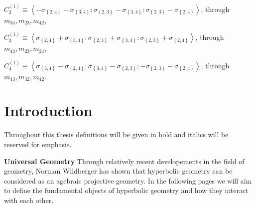 \documentclass[11pt]{article}
\begin{document}
$C_{2}^{\left( 1\right) }\equiv \left\langle -\sigma _{\left\{ 2,4\right\}
}-\sigma _{\left\{ 3,4\right\} }:\sigma _{\left\{ 2,3\right\} }-\sigma
_{\left\{ 3,4\right\} }:\sigma _{\left\{ 2,3\right\} }-\sigma _{\left\{
2,4\right\} }\right\rangle $, through $m_{34},m_{23},m_{42}$,

$C_{3}^{\left( 1\right) }\equiv \left\langle \sigma _{\left\{ 2,4\right\}
}+\sigma _{\left\{ 3,4\right\} }:\sigma _{\left\{ 2,3\right\} }+\sigma
_{\left\{ 3,4\right\} }:\sigma _{\left\{ 2,3\right\} }+\sigma _{\left\{
2,4\right\} }\right\rangle $, through $m_{43},m_{23},m_{24}$,

$C_{4}^{\left( 1\right) }\equiv \left\langle \sigma _{\left\{ 3,4\right\}
}-\sigma _{\left\{ 2,4\right\} }:\sigma _{\left\{ 3,4\right\} }-\sigma
_{\left\{ 2,3\right\} }:-\sigma _{\left\{ 2,3\right\} }-\sigma _{\left\{
2,4\right\} }\right\rangle $, through $m_{43},m_{32},m_{42}$.

\bigskip \pagebreak 

\section{\protect\bigskip Introduction}

Throughout this thesis definitions will be given in bold and italics will be
reserved for emphasis.\newline

\textbf{Universal Geometry} Through relatively recent developements in the
field of geometry, Norman Wildberger has shown that hyperbolic geometry can
be considered as an agebraic projective geometry. In the following pages we
will aim to define the fundamental objects of hyperbolic geometry and how
they interact with each other.\newline
\end{document}
